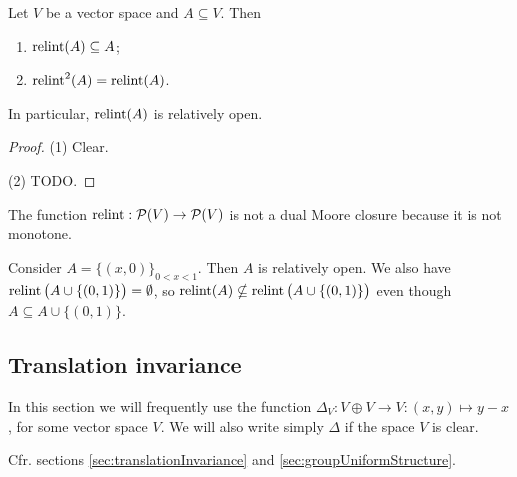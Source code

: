 \begin{lemma}
Let $V$ be a vector space and $A\subseteq V$. Then
\begin{enumerate}
\item $\operatorname{relint}(A)\subseteq A$;
\item $\operatorname{relint}^2(A) = \operatorname{relint}(A)$.
\end{enumerate}
\end{lemma}
In particular, $\operatorname{relint}(A)$ is relatively open.
\begin{proof}
(1) Clear.

(2) TODO.
\end{proof}

\begin{example}
The function $\operatorname{relint}: \operatorname{\mathcal{P}}(V)\to \operatorname{\mathcal{P}}(V)$ is not a dual Moore closure because it is not monotone.

Consider $A = \{(x,0)\}_{0<x<1}$. Then $A$ is relatively open. We also have $\operatorname{relint}\big(A\cup \{(0,1)\}\big) = \emptyset$, so $\operatorname{relint}(A) \nsubseteq \operatorname{relint}\big(A\cup \{(0,1)\}\big)$ even though $A\subseteq A\cup \{(0,1)\}$.
\end{example}

\subsection{Translation invariance}
In this section we will frequently use the function $\Delta_V: V\oplus V\to V: (x,y) \mapsto y-x$, for some vector space $V$. We will also write simply $\Delta$ if the space $V$ is clear.

Cfr. sections \ref{sec:translationInvariance} and \ref{sec:groupUniformStructure}.

